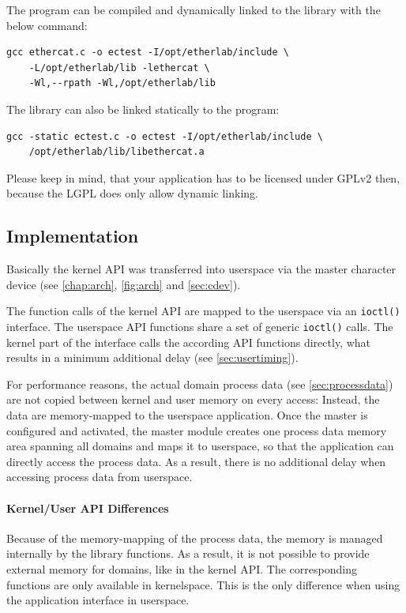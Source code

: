 \documentclass[a4paper,12pt,BCOR=6mm,bibtotoc,idxtotoc]{scrbook}
\begin{document}
The program can be compiled and dynamically linked to the library with the
below command:

\begin{lstlisting}[caption=Linker command for using the userspace library,
label=lst:linker-user]
gcc ethercat.c -o ectest -I/opt/etherlab/include \
    -L/opt/etherlab/lib -lethercat \
    -Wl,--rpath -Wl,/opt/etherlab/lib
\end{lstlisting}

The library can also be linked statically to the program:

\begin{lstlisting}
gcc -static ectest.c -o ectest -I/opt/etherlab/include \
    /opt/etherlab/lib/libethercat.a
\end{lstlisting}

Please keep in mind, that your application has to be licensed under GPLv2
then, because the LGPL does only allow dynamic linking.

\subsection{Implementation}
\label{sec:userimp}

Basically the kernel API was transferred into userspace via the master
character device (see \autoref{chap:arch}, \autoref{fig:arch} and
\autoref{sec:cdev}).

The function calls of the kernel API are mapped to the userspace via an
\lstinline+ioctl()+ interface. The userspace API functions share a set of
generic \lstinline+ioctl()+ calls. The kernel part of the interface calls the
according API functions directly, what results in a minimum additional delay
(see \autoref{sec:usertiming}).

For performance reasons, the actual domain process data (see
\autoref{sec:processdata}) are not copied between kernel and user memory on
every access: Instead, the data are memory-mapped to the userspace
application. Once the master is configured and activated, the master module
creates one process data memory area spanning all domains and maps it to
userspace, so that the application can directly access the process data. As a
result, there is no additional delay when accessing process data from
userspace.

\paragraph{Kernel/User API Differences} Because of the memory-mapping of the
process data, the memory is managed internally by the library functions. As a
result, it is not possible to provide external memory for domains, like in the
kernel API. The corresponding functions are only available in kernelspace.
This is the only difference when using the application interface in userspace.
\end{document}
